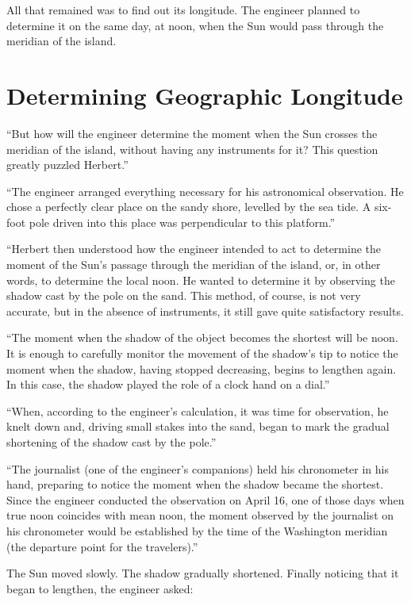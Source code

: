 All that remained was to find out its longitude. The engineer planned to determine it on the same day, at noon, when the Sun would pass through the meridian of the island.

\section{Determining Geographic Longitude}

``But how will the engineer determine the moment when the Sun crosses the meridian of the island, without having any instruments for it? This question greatly puzzled Herbert.''

``The engineer arranged everything necessary for his astronomical observation. He chose a perfectly clear place on the sandy shore, levelled by the sea tide. A six-foot pole driven into this place was perpendicular to this platform.''

``Herbert then understood how the engineer intended to act to determine the moment of the Sun's passage through the meridian of the island, or, in other words, to determine the local noon. He wanted to determine it by observing the shadow cast by the pole on the sand. This method, of course, is not very accurate, but in the absence of instruments, it still gave quite satisfactory results.

``The moment when the shadow of the object becomes the shortest will be noon. It is enough to carefully monitor the movement of the shadow's tip to notice the moment when the shadow, having stopped decreasing, begins to lengthen again. In this case, the shadow played the role of a clock hand on a dial.''

``When, according to the engineer's calculation, it was time for observation, he knelt down and, driving small stakes into the sand, began to mark the gradual shortening of the shadow cast by the pole.''

``The journalist (one of the engineer's companions) held his chronometer in his hand, preparing to notice the moment when the shadow became the shortest. Since the engineer conducted the observation on April 16, one of those days when true noon coincides with mean noon, the moment observed by the journalist on his chronometer would be established by the time of the Washington meridian (the departure point for the travelers).''

The Sun moved slowly. The shadow gradually shortened. Finally noticing that it began to lengthen, the engineer asked:

